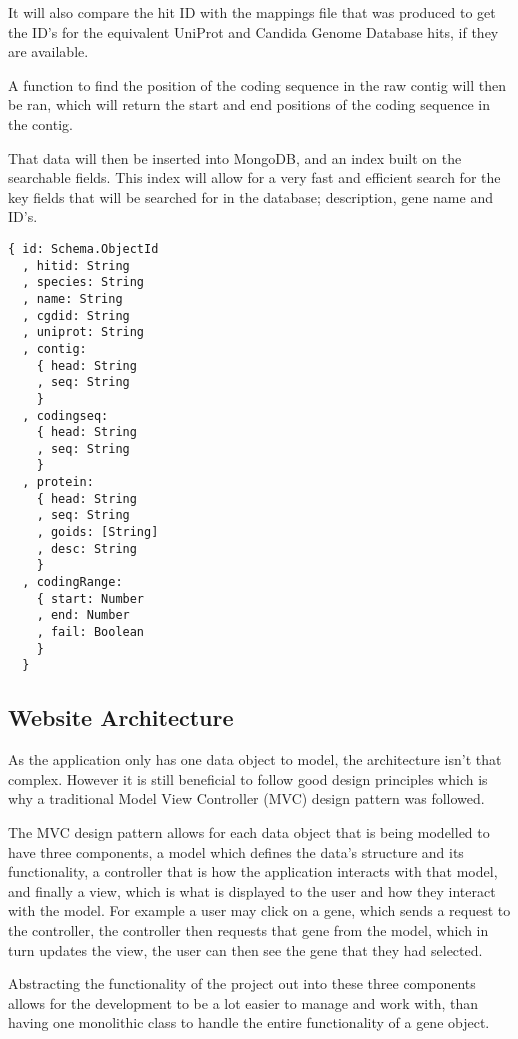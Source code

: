 It will also compare the hit ID with the mappings file that was produced to get the ID's for the equivalent UniProt and Candida Genome Database hits, if they are available. 

A function to find the position of the coding sequence in the raw contig will then be ran, which will return the start and end positions of the coding sequence in the contig.

That data will then be inserted into MongoDB, and an index built on the searchable fields. This index will allow for a very fast and efficient search for the key fields that will be searched for in the database; description, gene name and ID's.

\begin{lstlisting}[caption=The database schema that will represent a gene in the database.]
  { id: Schema.ObjectId
  , hitid: String
  , species: String
  , name: String
  , cgdid: String
  , uniprot: String
  , contig: 
    { head: String
    , seq: String 
    }
  , codingseq: 
    { head: String
    , seq: String 
    }
  , protein: 
    { head: String
    , seq: String
    , goids: [String]
    , desc: String 
    }
  , codingRange: 
    { start: Number
    , end: Number
    , fail: Boolean 
    }
  }
\end{lstlisting}

    
\subsection{Website Architecture}
As the application only has one data object to model, the architecture isn't that complex. However it is still beneficial to follow good design principles which is why a traditional Model View Controller (MVC) design pattern\cite{mvc} was followed. 

The MVC design pattern allows for each data object that is being modelled to have three components, a model which defines the data's structure and its functionality, a controller that is how the application interacts with that model, and finally a view, which is what is displayed to the user and how they interact with the model. For example a user may click on a gene, which sends a request to the controller, the controller then requests that gene from the model, which in turn updates the view, the user can then see the gene that they had selected. 

Abstracting the functionality of the project out into these three components allows for the development to be a lot easier to manage and work with, than having one monolithic class to handle the entire functionality of a gene object.

